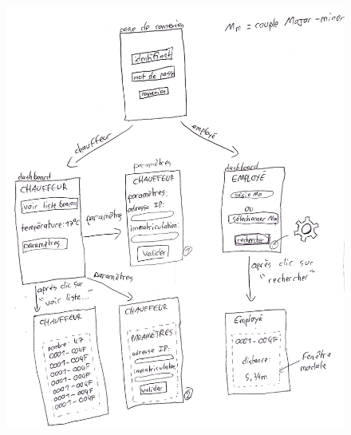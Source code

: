 \documentclass[10pt,a4paper]{book}
\begin{document}
\begin{figure}[h!]
    \centering
    \includegraphics[scale=0.2]{Images/idee_design_application1.png}
    \caption{}
    \label{idee_design_application1}
\end{figure}
\end{document}
